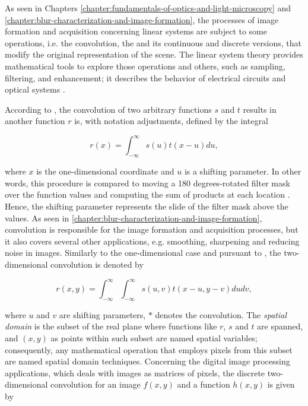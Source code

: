 As seen in Chapters \ref{chapter:fundamentals-of-optics-and-light-microscopy} and \ref{chapter:blur-characterization-and-image-formation}, the processes of image formation and acquisition concerning linear systems are subject to some operations, i.e. the convolution, the  and its continuous and discrete versions, that modify the original representation of the scene. The linear system theory provides mathematical tools to explore those operations and others, such as sampling, filtering, and enhancement; it describes the behavior of electrical circuits and optical systems \cite{castleman1996digital}.

According to , the convolution of two arbitrary functions $s$ and $t$ results in another function $r$ is, with notation adjustments, defined by the integral

\begin{equation}
\label{eqn:one_dimensional_convolution}
r(x) = \int_{-\infty}^{\infty}s(u) t(x - u) du,
\end{equation}

\noindent where $x$ is the one-dimensional coordinate and $u$ is a shifting parameter. In other words, this procedure is compared to moving a 180 degrees-rotated filter mask over the function values and computing the sum of products at each location \cite{gonzalez2018digital}. Hence, the shifting parameter represents the slide of the filter mask above the values. As seen in \autoref{chapter:blur-characterization-and-image-formation}, convolution is responsible for the image formation and acquisition processes, but it also covers several other applications, e.g. smoothing, sharpening and reducing noise in images. Similarly to the one-dimensional case and pursuant to , the two-dimensional convolution is denoted by

\begin{equation}
\label{eqn:two_dimensional_convolution}
r(x,y) = \int_{-\infty}^{\infty}
         \int_{-\infty}^{\infty}
         s(u,v) t(x - u, y - v) du dv,
\end{equation}

\noindent where $u$ and $v$ are shifting parameters, $\ast$ denotes the convolution. The \emph{spatial domain} is the subset of the real plane where functions like $r$, $s$ and $t$ are spanned, and $(x,y)$ as points within such subset are named spatial variables; consequently, any mathematical operation that employs pixels from this subset are named spatial domain techniques. Concerning the digital image processing applications, which deals with images as matrices of pixels, the discrete two-dimensional convolution for an image $f(x,y)$ and a function $h(x,y)$ is given by 

